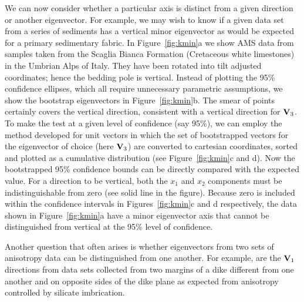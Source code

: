 We can now  consider whether a particular axis is distinct from
a given direction or another eigenvector.  For example, we may wish to know
if a given data set from a series of sediments has a vertical minor 
eigenvector as would be expected for a primary sedimentary fabric.  
In Figure~\ref{fig:kmin}a we show AMS data from samples taken 
from the Scaglia Bianca Formation (Cretaceous white limestones)
in the Umbrian Alps of Italy.  They have been rotated into  tilt adjusted 
coordinates; hence the bedding pole is vertical.
Instead of plotting the 95\% confidence ellipses, which all require
 unnecessary parametric assumptions, we show the bootstrap eigenvectors in 
Figure~\ref{fig:kmin}b.  The smear of points certainly covers the vertical
direction,  consistent with a  vertical direction for $\hbox{\bf V}_3$.  To
make the test at a given level of confidence (say 95\%), we can employ the
method developed for unit vectors in which the set of bootstrapped vectors for the eigenvector of
choice (here $\hbox{\bf V}_3$) are converted to cartesian coordinates,  sorted and plotted as a cumulative distribution (see  Figure~\ref{fig:kmin}c and d).
%
Now the bootstrapped
 95\% confidence bounds can be directly compared with the expected
value.  For a direction to be vertical, both the $x_1$ and $x_2$ components
must be indistinguishable from zero (see solid line in the figure).  Because zero is included within
the confidence intervals in Figures~\ref{fig:kmin}c and d respectively, the  data  shown in Figure~\ref{fig:kmin}a have a minor eigenvector axis  that cannot be distinguished from vertical 
 at the 95\% level of confidence.
 




Another question that often arises is whether eigenvectors from  
two sets of anisotropy data can be 
distinguished from one another. For example, are the $\hbox{\bf V}_1$ directions from data sets
collected from two margins of a dike different from one another and on opposite
sides of the dike plane as expected from anisotropy controlled by silicate
imbrication.  




